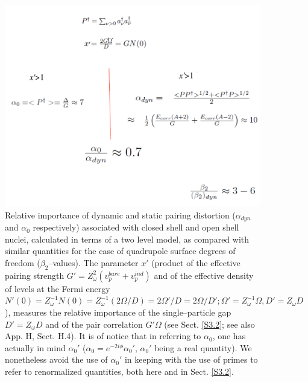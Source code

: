   \begin{figure}
  \centerline{\includegraphics*[width=\textwidth,angle=0]{nutshell/figs/fig1E8.pdf}}
  \caption{Relative importance of dynamic and static pairing distortion ($\alpha_{dyn}$ and $\alpha_0$ respectively) associated with closed shell and open shell  nuclei, calculated in terms of a two level model, as compared with similar quantities for the case of quadrupole surface degrees of freedom ($\beta_2$--values). The parameter $x'$ (product of the effective pairing strength $G'=Z_\omega^2(v_p^{bare}+v_p^{ind})$ and of the effective density of levels at the Fermi energy $N'(0)=Z_\omega^{-1}N(0)=Z^{-1}_\omega(2\Omega/D)=2\Omega'/D=2\Omega/D';\Omega'=Z_\omega^{-1}\Omega,D'=Z_\omega D$), measures the relative importance of the single--particle gap $D'=Z_\omega D$ and of the pair correlation $G'\Omega$ (see Sect. \ref{S3.2};  see also \cite{Brink:05} App. H, Sect. H.4). It is of notice that in referring to $\alpha_0$, one has actually in mind $\alpha_0'$ ($\alpha_0=e^{-2i\phi}\alpha_0'$, $\alpha_0'$ being a real quantity). We nonetheless avoid the use of $\alpha_0'$ in keeping with the use of primes to refer to renormalized quantities, both here and in Sect. \ref{S3.2}. }\label{fig1_E8}
  \end{figure}
